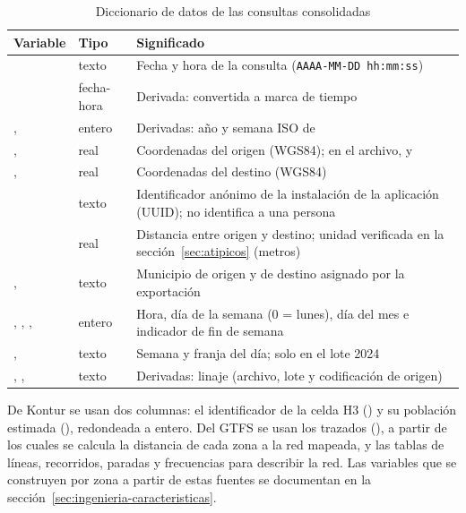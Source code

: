 \begin{table}[H]
  \centering
  \caption{Diccionario de datos de las consultas consolidadas}
  \label{tab:diccionario-datos}
  \interlineadoSimple
  \small
  \begin{tabularx}{\textwidth}{@{}L{0.27\textwidth}L{0.13\textwidth}Y@{}}
    \toprule
    \textbf{Variable} & \textbf{Tipo} & \textbf{Significado} \\
    \midrule
     & texto & Fecha y hora de la consulta (\texttt{AAAA-MM-DD hh:mm:ss}) \\
     & fecha-hora & Derivada:  convertida a marca de tiempo \\
    ,  & entero & Derivadas: año y semana ISO de  \\
    ,  & real & Coordenadas del origen (WGS84); en el archivo,  y  \\
    ,  & real & Coordenadas del destino (WGS84) \\
     & texto & Identificador anónimo de la instalación de la aplicación (UUID); no identifica a una persona \\
     & real & Distancia entre origen y destino; unidad verificada en la sección~\ref{sec:atipicos} (metros) \\
    ,  & texto & Municipio de origen y de destino asignado por la exportación \\
    , , ,  & entero & Hora, día de la semana (0 = lunes), día del mes e indicador de fin de semana \\
    ,  & texto & Semana y franja del día; solo en el lote 2024 \\
    , ,  & texto & Derivadas: linaje (archivo, lote y codificación de origen) \\
    \bottomrule
  \end{tabularx}
\end{table}

De Kontur se usan dos columnas: el identificador de la celda H3 () y su
población estimada (), redondeada a entero. Del GTFS se usan los trazados
(), a partir de los cuales se calcula la distancia de cada zona a la red
mapeada, y las tablas de líneas, recorridos, paradas y frecuencias para describir la red.
Las variables que se construyen por zona a partir de estas fuentes se documentan en la
sección~\ref{sec:ingenieria-caracteristicas}.

